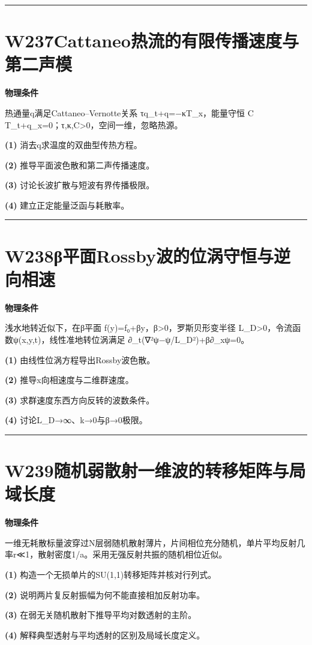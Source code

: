 \documentclass[UTF8,a4paper,11pt,oneside,openany]{ctexbook}
\begin{document}
\par\bigskip\hrule\bigskip
\section*{W237\quad Cattaneo热流的有限传播速度与第二声模}
\textbf{物理条件}\par 热通量q满足Cattaneo–Vernotte关系 τq\_t+q=−κT\_x，能量守恒 C T\_t+q\_x=0；τ,κ,C>0，空间一维，忽略热源。
\par\noindent\textbf{(1)} 消去q求温度的双曲型传热方程。
\par\noindent\textbf{(2)} 推导平面波色散和第二声传播速度。
\par\noindent\textbf{(3)} 讨论长波扩散与短波有界传播极限。
\par\noindent\textbf{(4)} 建立正定能量泛函与耗散率。

\par\bigskip\hrule\bigskip
\section*{W238\quad β平面Rossby波的位涡守恒与逆向相速}
\textbf{物理条件}\par 浅水地转近似下，在β平面 f(y)=f₀+βy，β>0，罗斯贝形变半径 L\_D>0，令流函数ψ(x,y,t)，线性准地转位涡满足 ∂\_t(∇²ψ−ψ/L\_D²)+β∂\_xψ=0。
\par\noindent\textbf{(1)} 由线性位涡方程导出Rossby波色散。
\par\noindent\textbf{(2)} 推导x向相速度与二维群速度。
\par\noindent\textbf{(3)} 求群速度东西方向反转的波数条件。
\par\noindent\textbf{(4)} 讨论L\_D→∞、k→0与β→0极限。

\par\bigskip\hrule\bigskip
\section*{W239\quad 随机弱散射一维波的转移矩阵与局域长度}
\textbf{物理条件}\par 一维无耗散标量波穿过N层弱随机散射薄片，片间相位充分随机，单片平均反射几率r≪1，散射密度1/a。采用无强反射共振的随机相位近似。
\par\noindent\textbf{(1)} 构造一个无损单片的SU(1,1)转移矩阵并核对行列式。
\par\noindent\textbf{(2)} 说明两片复反射振幅为何不能直接相加反射功率。
\par\noindent\textbf{(3)} 在弱无关随机散射下推导平均对数透射的主阶。
\par\noindent\textbf{(4)} 解释典型透射与平均透射的区别及局域长度定义。
\end{document}
